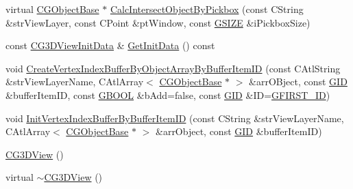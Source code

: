 \begin{DoxyCompactItemize}
\item 
virtual \hyperlink{class_c_g_object_base}{C\+G\+Object\+Base} $\ast$ \hyperlink{class_c_g3_d_view_aeb412f47613ba426c47580e4595b061a}{Calc\+Intersect\+Object\+By\+Pickbox} (const C\+String \&str\+View\+Layer, const C\+Point \&pt\+Window, const \hyperlink{_g_types_8h_ac7dd75e8df268a0368c6cb433764fdcb}{G\+S\+I\+Z\+E} \&i\+Pickbox\+Size)
\item 
const \hyperlink{class_c_g3_d_view_init_data}{C\+G3\+D\+View\+Init\+Data} \& \hyperlink{class_c_g3_d_view_a48e85bf81912c86d4b18a2f8d03966dc}{Get\+Init\+Data} () const 
\item 
void \hyperlink{class_c_g3_d_view_a32f90a1e23f8e5cf4e61970cdad5ea24}{Create\+Vertex\+Index\+Buffer\+By\+Object\+Array\+By\+Buffer\+Item\+I\+D} (const C\+Atl\+String \&str\+View\+Layer\+Name, C\+Atl\+Array$<$ \hyperlink{class_c_g_object_base}{C\+G\+Object\+Base} $\ast$ $>$ \&arr\+O\+Bject, const \hyperlink{_g_types_8h_a5b96ecb16d8e437977d12cd40aa6f6d8}{G\+I\+D} \&buffer\+Item\+I\+D, const \hyperlink{_g_types_8h_a2901915743626352a6820c5405f556dc}{G\+B\+O\+O\+L} \&b\+Add=false, const \hyperlink{_g_types_8h_a5b96ecb16d8e437977d12cd40aa6f6d8}{G\+I\+D} \&I\+D=\hyperlink{_g_types_8h_a124fbb974ba5e89342bd060f0e8f09c1}{G\+F\+I\+R\+S\+T\+\_\+\+I\+D})
\item 
void \hyperlink{class_c_g3_d_view_af973e41e937b33d8d5a868ceab39b305}{Init\+Vertex\+Index\+Buffer\+By\+Buffer\+Item\+I\+D} (const C\+String \&str\+View\+Layer\+Name, C\+Atl\+Array$<$ \hyperlink{class_c_g_object_base}{C\+G\+Object\+Base} $\ast$ $>$ \&arr\+Object, const \hyperlink{_g_types_8h_a5b96ecb16d8e437977d12cd40aa6f6d8}{G\+I\+D} \&buffer\+Item\+I\+D)
\item 
\hyperlink{class_c_g3_d_view_ab56c0094148c4e2bbb10c75aff61fdbd}{C\+G3\+D\+View} ()
\item 
virtual \hyperlink{class_c_g3_d_view_a039384f0628e4d8c0c88323b1f92eafe}{$\sim$\+C\+G3\+D\+View} ()
\end{DoxyCompactItemize}
